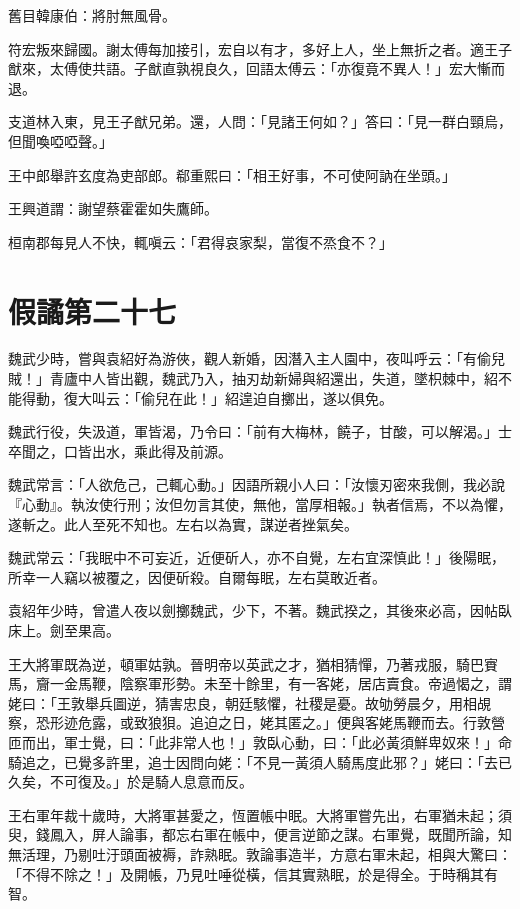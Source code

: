 舊目韓康伯：將肘無風骨。

符宏叛來歸國。謝太傅每加接引，宏自以有才，多好上人，坐上無折之者。適王子猷來，太傅使共語。子猷直孰視良久，回語太傅云：「亦復竟不異人！」宏大慚而退。

支道林入東，見王子猷兄弟。還，人問：「見諸王何如？」答曰：「見一群白頸烏，但聞喚啞啞聲。」

王中郎舉許玄度為吏部郎。郗重熙曰：「相王好事，不可使阿訥在坐頭。」

王興道謂：謝望蔡霍霍如失鷹師。

桓南郡每見人不快，輒嗔云：「君得哀家梨，當復不烝食不？」



\chapter{假譎第二十七}

魏武少時，嘗與袁紹好為游俠，觀人新婚，因潛入主人園中，夜叫呼云：「有偷兒賊！」青廬中人皆出觀，魏武乃入，抽刃劫新婦與紹還出，失道，墜枳棘中，紹不能得動，復大叫云：「偷兒在此！」紹遑迫自擲出，遂以俱免。

魏武行役，失汲道，軍皆渴，乃令曰：「前有大梅林，饒子，甘酸，可以解渴。」士卒聞之，口皆出水，乘此得及前源。

魏武常言：「人欲危己，己輒心動。」因語所親小人曰：「汝懷刃密來我側，我必說『心動』。執汝使行刑；汝但勿言其使，無他，當厚相報。」執者信焉，不以為懼，遂斬之。此人至死不知也。左右以為實，謀逆者挫氣矣。

魏武常云：「我眠中不可妄近，近便斫人，亦不自覺，左右宜深慎此！」後陽眠，所幸一人竊以被覆之，因便斫殺。自爾每眠，左右莫敢近者。

袁紹年少時，曾遣人夜以劍擲魏武，少下，不著。魏武揆之，其後來必高，因帖臥床上。劍至果高。

王大將軍既為逆，頓軍姑孰。晉明帝以英武之才，猶相猜憚，乃著戎服，騎巴賨馬，齎一金馬鞭，陰察軍形勢。未至十餘里，有一客姥，居店賣食。帝過愒之，謂姥曰：「王敦舉兵圖逆，猜害忠良，朝廷駭懼，社稷是憂。故劬勞晨夕，用相覘察，恐形迹危露，或致狼狽。追迫之日，姥其匿之。」便與客姥馬鞭而去。行敦營匝而出，軍士覺，曰：「此非常人也！」敦臥心動，曰：「此必黃須鮮卑奴來！」命騎追之，已覺多許里，追士因問向姥：「不見一黃須人騎馬度此邪？」姥曰：「去已久矣，不可復及。」於是騎人息意而反。

王右軍年裁十歲時，大將軍甚愛之，恆置帳中眠。大將軍嘗先出，右軍猶未起；須臾，錢鳳入，屏人論事，都忘右軍在帳中，便言逆節之謀。右軍覺，既聞所論，知無活理，乃剔吐汙頭面被褥，詐熟眠。敦論事造半，方意右軍未起，相與大驚曰：「不得不除之！」及開帳，乃見吐唾從橫，信其實熟眠，於是得全。于時稱其有智。


